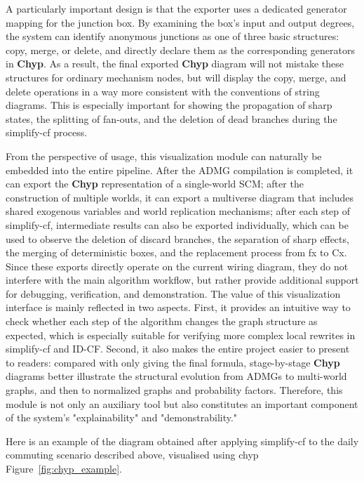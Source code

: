 \documentclass[a4paper]{report}
\begin{document}
A particularly important design is that the exporter uses a dedicated generator mapping for the junction box. By examining the box's input and output degrees, the system can identify anonymous junctions as one of three basic structures: copy, merge, or delete, and directly declare them as the corresponding generators in \textbf{Chyp}. As a result, the final exported \textbf{Chyp} diagram will not mistake these structures for ordinary mechanism nodes, but will display the copy, merge, and delete operations in a way more consistent with the conventions of string diagrams. This is especially important for showing the propagation of sharp states, the splitting of fan-outs, and the deletion of dead branches during the simplify-cf process.

From the perspective of usage, this visualization module can naturally be embedded into the entire pipeline. After the ADMG compilation is completed, it can export the \textbf{Chyp} representation of a single-world SCM; after the construction of multiple worlds, it can export a multiverse diagram that includes shared exogenous variables and world replication mechanisms; after each step of simplify-cf, intermediate results can also be exported individually, which can be used to observe the deletion of discard branches, the separation of sharp effects, the merging of deterministic boxes, and the replacement process from fx to Cx. Since these exports directly operate on the current wiring diagram, they do not interfere with the main algorithm workflow, but rather provide additional support for debugging, verification, and demonstration. The value of this visualization interface is mainly reflected in two aspects. First, it provides an intuitive way to check whether each step of the algorithm changes the graph structure as expected, which is especially suitable for verifying more complex local rewrites in simplify-cf and ID-CF. Second, it also makes the entire project easier to present to readers: compared with only giving the final formula, stage-by-stage \textbf{Chyp} diagrams better illustrate the structural evolution from ADMGs to multi-world graphs, and then to normalized graphs and probability factors. Therefore, this module is not only an auxiliary tool but also constitutes an important component of the system's "explainability" and "demonstrability."

Here is an example of the diagram obtained after applying simplify-cf to the daily commuting scenario described above, visualised using chyp Figure~\ref{fig:chyp_example}.
\end{document}
